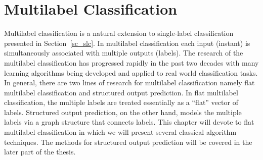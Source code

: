 {




%
%
\chapter{Multilabel Classification} \label{ch_fmlc}

Multilabel classification is a natural extension to single-label classification presented in Section~\ref{sc_slc}.
In multilabel classification each input (instant) is simultaneously associated with multiple outputs (labels).
The research of the multilabel classification has progressed rapidly in the past two decades with many learning algorithms being developed and applied to real world classification tasks.
In general, there are two lines of research for multilabel classification namely flat multilabel classification and structured output prediction.
In flat multilabel classification, the multiple labels are treated essentially as a ``flat'' vector of labels.
Structured output prediction, on the other hand, models the multiple labels via a graph structure that connects labels.
This chapter will devote to flat multilabel classification in which we will present several classical algorithm techniques.
The methods for structured output prediction will be covered in the later part of the thesis.

}
